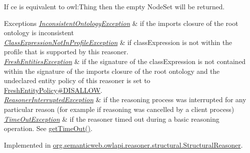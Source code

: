 If {\ttfamily ce} is equivalent to {\ttfamily owl\-:Thing} then the empty {\ttfamily Node\-Set} will be returned.


\begin{DoxyExceptions}{Exceptions}
{\em \hyperlink{classorg_1_1semanticweb_1_1owlapi_1_1reasoner_1_1_inconsistent_ontology_exception}{Inconsistent\-Ontology\-Exception}} & if the imports closure of the root ontology is inconsistent \\
\hline
{\em \hyperlink{classorg_1_1semanticweb_1_1owlapi_1_1reasoner_1_1_class_expression_not_in_profile_exception}{Class\-Expression\-Not\-In\-Profile\-Exception}} & if {\ttfamily class\-Expression} is not within the profile that is supported by this reasoner. \\
\hline
{\em \hyperlink{classorg_1_1semanticweb_1_1owlapi_1_1reasoner_1_1_fresh_entities_exception}{Fresh\-Entities\-Exception}} & if the signature of the class\-Expression is not contained within the signature of the imports closure of the root ontology and the undeclared entity policy of this reasoner is set to \hyperlink{enumorg_1_1semanticweb_1_1owlapi_1_1reasoner_1_1_fresh_entity_policy_a762eae6d5b2449d125311ecaabfdc8d0}{Fresh\-Entity\-Policy\#\-D\-I\-S\-A\-L\-L\-O\-W}. \\
\hline
{\em \hyperlink{classorg_1_1semanticweb_1_1owlapi_1_1reasoner_1_1_reasoner_interrupted_exception}{Reasoner\-Interrupted\-Exception}} & if the reasoning process was interrupted for any particular reason (for example if reasoning was cancelled by a client process) \\
\hline
{\em \hyperlink{classorg_1_1semanticweb_1_1owlapi_1_1reasoner_1_1_time_out_exception}{Time\-Out\-Exception}} & if the reasoner timed out during a basic reasoning operation. See \hyperlink{interfaceorg_1_1semanticweb_1_1owlapi_1_1reasoner_1_1_o_w_l_reasoner_a44b2c968f989afe5290db29c90faa164}{get\-Time\-Out()}. \\
\hline
\end{DoxyExceptions}


Implemented in \hyperlink{classorg_1_1semanticweb_1_1owlapi_1_1reasoner_1_1structural_1_1_structural_reasoner_a2738b25ae286b0da929053291a7a82c6}{org.\-semanticweb.\-owlapi.\-reasoner.\-structural.\-Structural\-Reasoner}.


